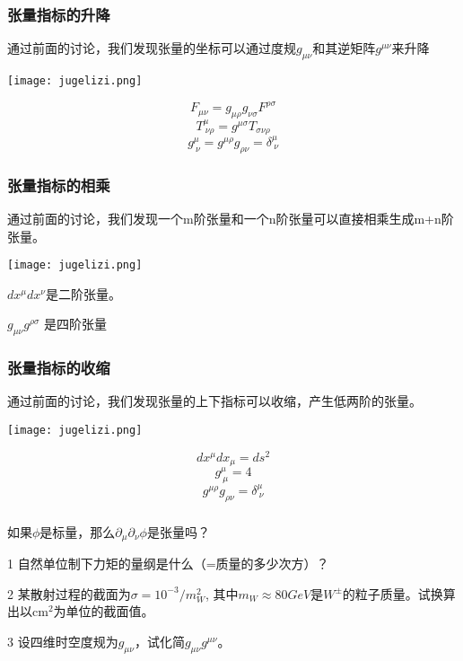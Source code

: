 \documentclass[CJK]{beamer}
\begin{document}
\begin{frame}
\frametitle{\bch 张量指标的升降\ech}
\bch
通过前面的讨论，我们发现张量的坐标可以通过度规$g_{\mu\nu}$和其逆矩阵$g^{\mu\nu}$来升降
\ech
{\vskip 0.1in}

\begin{minipage}{0.3\textwidth}
\texttt{[image: jugelizi.png]}
\end{minipage}
\begin{minipage}{0.6\textwidth}
$$F_{\mu\nu} = g_{\mu\rho}g_{\nu\sigma}F^{\rho\sigma}$$
$$T^{\mu}_{\ \nu\rho} = g^{\mu\sigma} T_{\sigma\nu\rho}$$
$$g^{\mu}_{\ \nu} = g^{\mu\rho}g_{\rho\nu} = \delta^{\mu}_{\ \nu}$$
\end{minipage}
\end{frame}


\begin{frame}
\frametitle{\bch 张量指标的相乘\ech}
\bch
通过前面的讨论，我们发现一个m阶张量和一个n阶张量可以直接相乘生成m+n阶张量。
\ech
{\vskip 0.1in}

\begin{minipage}{0.3\textwidth}
\texttt{[image: jugelizi.png]}
\end{minipage}
\begin{minipage}{0.6\textwidth}
\bch
$dx^\mu dx^\nu$是二阶张量。

$g_{\mu\nu}g^{\rho\sigma}$ 是四阶张量
\ech
\end{minipage}
\end{frame}



\begin{frame}
\frametitle{\bch 张量指标的收缩\ech}
\bch
通过前面的讨论，我们发现张量的上下指标可以收缩，产生低两阶的张量。
\ech
{\vskip 0.1in}

\begin{minipage}{0.3\textwidth}
\texttt{[image: jugelizi.png]}
\end{minipage}
\begin{minipage}{0.6\textwidth}
$$dx^\mu dx_\mu = ds^2$$
$$g^{\mu}_{\ \mu} = 4$$
$$g^{\mu\rho}g_{\rho\nu} = \delta^{\mu}_{\ \nu}$$
\end{minipage}
\end{frame}



\begin{frame}
\frametitle{\ech}
\bch
{}
如果$\phi$是标量，那么$\partial_\mu\partial_\nu\phi$是张量吗？
\ech
\end{frame}

\begin{frame}
  \bch
  \bitem
\item[1]{自然单位制下力矩的量纲是什么（=质量的多少次方）？}
\item[2]{某散射过程的截面为$\sigma = 10^{-3}/m_W^2$, 其中$m_W \approx 80 GeV$是$W^{\pm}$的粒子质量。试换算出以$\mathrm{cm}^2$为单位的截面值。}
\item[3]{设四维时空度规为$g_{\mu\nu}$，试化简$g_{\mu\nu}g^{\mu\nu}$。}
  \eitem
  \ech
\end{frame}
\end{document}
